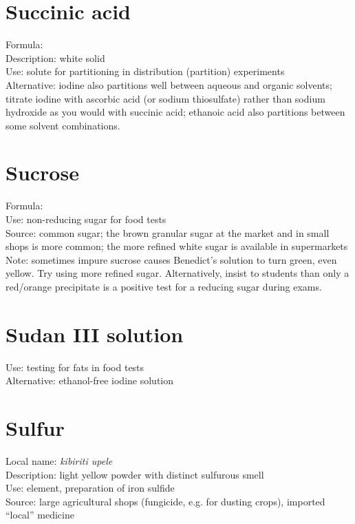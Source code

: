 \section{Succinic acid}
Formula: \\
Description: white solid\\
Use: solute for partitioning in distribution (partition) experiments\\
Alternative: iodine also partitions well between aqueous and organic solvents; 
titrate iodine with ascorbic acid (or sodium thiosulfate) 
rather than sodium hydroxide as you would with succinic acid; 
ethanoic acid also partitions between some solvent combinations.

\section{Sucrose}
Formula: \\
Use: non-reducing sugar for food tests\\
Source: common sugar; 
the brown granular sugar at the market and in small shops is more common; 
the more refined white sugar is available in supermarkets\\
Note: sometimes impure sucrose causes Benedict's solution to turn green, 
even yellow. Try using more refined sugar.
Alternatively, insist to students than only a red/orange precipitate 
is a positive test for a reducing sugar during exams.

\section{Sudan III solution}
Use: testing for fats in food tests\\
Alternative: ethanol-free iodine solution

\section{Sulfur}
Local name: \textit{kibiriti upele}\\
Description: light yellow powder with distinct sulfurous smell\\
Use: element, 
preparation of iron sulfide\\
Source: large agricultural shops (fungicide, 
e.g. 
for dusting crops), 
imported ``local'' medicine

